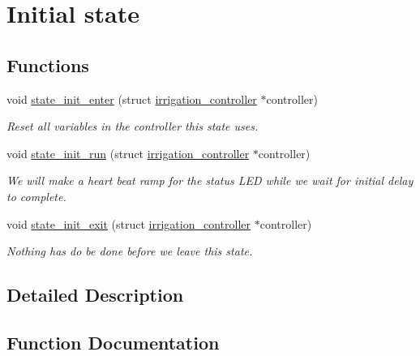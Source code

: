 \hypertarget{group__state__init}{}\section{Initial state}
\label{group__state__init}
\subsection*{Functions}
\begin{DoxyCompactItemize}
\item 
void \hyperlink{group__state__init_gaeca2f683660bf42f5258acd6aac353d0}{state\+\_\+init\+\_\+enter} (struct \hyperlink{structirrigation__controller}{irrigation\+\_\+controller} $\ast$controller)
\begin{DoxyCompactList}\small\item\em Reset all variables in the controller this state uses. \end{DoxyCompactList}\item 
void \hyperlink{group__state__init_ga5b5f5a7ec8534a643fb599efdee6ed4f}{state\+\_\+init\+\_\+run} (struct \hyperlink{structirrigation__controller}{irrigation\+\_\+controller} $\ast$controller)
\begin{DoxyCompactList}\small\item\em We will make a heart beat ramp for the status L\+E\+D while we wait for initial delay to complete. \end{DoxyCompactList}\item 
void \hyperlink{group__state__init_ga52863e306edb45d15c12acdecb7e5555}{state\+\_\+init\+\_\+exit} (struct \hyperlink{structirrigation__controller}{irrigation\+\_\+controller} $\ast$controller)
\begin{DoxyCompactList}\small\item\em Nothing has do be done before we leave this state. \end{DoxyCompactList}\end{DoxyCompactItemize}


\subsection{Detailed Description}


\subsection{Function Documentation}
\hypertarget{group__state__init_gaeca2f683660bf42f5258acd6aac353d0}{}
